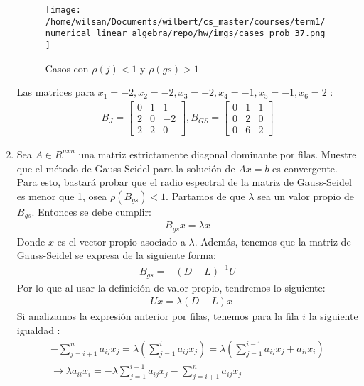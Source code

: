\documentclass{article}
\begin{document}
\begin{enumerate}
\begin{figure}[H]
	\centering
	\texttt{[image: /home/wilsan/Documents/wilbert/cs\_master/courses/term1/numerical\_linear\_algebra/repo/hw/imgs/cases\_prob\_37.png]}
	\caption{Casos con $\rho(j) < 1$ y $\rho(gs) > 1$}
	\label{fig:img_pecc}
\end{figure}
Las matrices para $x_{1}=-2,x_{2}=-2,x_{3}=-2,x_{4}=-1,x_{5}=-1,x_{6}=2$ :
\begin{gather*}
B_{J} = 
\begin{bmatrix}
		0 & 1 &  1 \\
	    2 & 0 & -2 \\
	    2 & 2 &  0
\end{bmatrix},
B_{GS} = 
\begin{bmatrix}
	0 & 1 &	1 \\
    0 & 2 & 0 \\
    0 & 6 & 2
\end{bmatrix}
\end{gather*}
\item Sea $A \in R^{nxn} $ una matriz estrictamente diagonal dominante por filas. Muestre que el m\'etodo de Gauss-Seidel para la soluci\'on de $Ax = b$ es convergente.
\\
Para esto, bastar\'a probar que el radio espectral de la matriz de Gauss-Seidel es menor que 1, osea $\rho(B_{gs}) < 1$.
Partamos de que $\lambda$ sea un valor propio de $B_{gs}$. Entonces se debe cumplir:
\begin{gather*}
B_{gs}x = \lambda x
\end{gather*}
Donde $x$ es el vector propio asociado a $\lambda$. Adem\'as, tenemos que la matriz de Gauss-Seidel se expresa de la siguiente forma:
\begin{gather*}
B_{gs} = -( D + L )^{-1}U
\end{gather*}
Por lo que al usar la definici\'on de valor propio, tendremos lo siguiente:
\begin{gather*}
-Ux = \lambda ( D + L )x
\end{gather*}
Si analizamos la expresi\'on anterior por filas, tenemos para la fila $i$ la siguiente igualdad :
\begin{gather*}
-\sum_{j=i+1}^{n}a_{ij}x_{j} = \lambda ( \sum_{j=1}^{i}a_{ij}x_{j} ) = \lambda ( \sum_{j=1}^{i-1}a_{ij}x_{j} + a_{ii}x_{i}) \\
\rightarrow \lambda a_{ii}x_{i} = -\lambda \sum_{j=1}^{i-1}a_{ij}x_{j} - \sum_{j=i+1}^{n}a_{ij}x_{j}

\end{gather*}
\end{enumerate}
\end{document}
